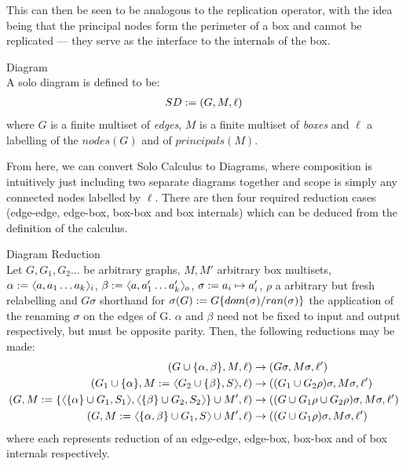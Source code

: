     This can then be seen to be analogous to the replication operator, with the idea being that the principal nodes form the perimeter of a box and cannot be replicated --- they serve as the interface to the internals of the box.

    \begin{definition}{Diagram\\}
        A solo diagram is defined to be:
        \begin{align*}
            SD := (G, M, \ell)
        \end{align*}
        where $G$ is a finite multiset of \textit{edges}, $M$ is a finite multiset of \textit{boxes} and $\ell$ a labelling of the $nodes(G)$ and of $principals(M)$.
    \end{definition}
    
    From here, we can convert Solo Calculus to Diagrams, where composition is intuitively just including two separate diagrams together and scope is simply any connected nodes labelled by $\ell$.
    There are then four required reduction cases (edge-edge, edge-box, box-box and box internals) which can be deduced from the definition of the calculus.

    \begin{definition}{Diagram Reduction\\}
        Let $G, G_1, G_2 \ldots$ be arbitrary graphs, $M, M'$ arbitrary box multisets, $\alpha \defeq \langl a, a_1 \ldots a_k\rangl_i$, $\beta \defeq \langl a, a_1' \ldots a_k'\rangl_o$, $\sigma := a_i \mapsto a_i'$, $\rho$ a arbitrary but fresh relabelling and $G\sigma$ shorthand for $\sigma(G) := G\{dom(\sigma) / ran(\sigma)\}$ the application of the renaming $\sigma$ on the edges of G.
        $\alpha$ and $\beta$ need not be fixed to input and output respectively, but must be opposite parity.
        Then, the following reductions may be made:
        \begin{align*}
            (G \cup \{\alpha, \beta\}, M, \ell)                                                                             & \rightarrow (G\sigma, M\sigma, \ell') \\
            (G_1 \cup \{\alpha\}, M \defeq \langl G_2 \cup \{\beta\}, S\rangl, \ell)                                        & \rightarrow ((G_1 \cup G_2\rho)\sigma, M\sigma, \ell') \\
            (G, M \defeq \{\langl \{ \alpha \} \cup G_1, S_1\rangl,\langl \{ \beta \} \cup G_2, S_2\rangl\} \cup M', \ell)    & \rightarrow ((G \cup G_1\rho \cup G_2\rho)\sigma, M\sigma, \ell') \\
            (G, M \defeq \langl \{ \alpha, \beta \} \cup G_1, S\rangl \cup M', \ell)                                          & \rightarrow ((G \cup G_1\rho)\sigma, M\sigma, \ell')
        \end{align*}
        where each represents reduction of an edge-edge, edge-box, box-box and of box internals respectively.
    \end{definition}

